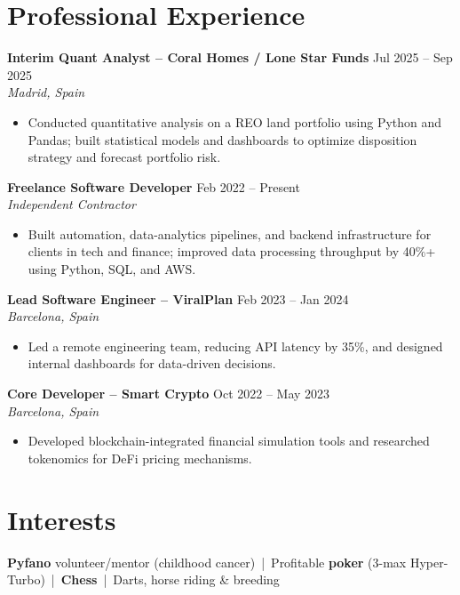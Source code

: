 \documentclass[a4paper]{article}
\begin{document}
\vspace{0.08cm}

\section*{Professional Experience}

\textbf{Interim Quant Analyst -- Coral Homes / Lone Star Funds} \hfill Jul 2025 -- Sep 2025 \\
\textit{Madrid, Spain}
\begin{itemize}
    \item Conducted quantitative analysis on a REO land portfolio using Python and Pandas; built statistical models and dashboards to optimize disposition strategy and forecast portfolio risk.
\end{itemize}

\textbf{Freelance Software Developer} \hfill Feb 2022 -- Present \\
\textit{Independent Contractor}
\begin{itemize}
    \item Built automation, data-analytics pipelines, and backend infrastructure for clients in tech and finance; improved data processing throughput by 40\%+ using Python, SQL, and AWS.
\end{itemize}

\textbf{Lead Software Engineer -- ViralPlan} \hfill Feb 2023 -- Jan 2024 \\
\textit{Barcelona, Spain}
\begin{itemize}
    \item Led a remote engineering team, reducing API latency by 35\%, and designed internal dashboards for data-driven decisions.
\end{itemize}

\textbf{Core Developer -- Smart Crypto} \hfill Oct 2022 -- May 2023 \\
\textit{Barcelona, Spain}
\begin{itemize}
    \item Developed blockchain-integrated financial simulation tools and researched tokenomics for DeFi pricing mechanisms.
\end{itemize}

\vspace{0.08cm}

\section*{Interests}
\textbf{Pyfano} volunteer/mentor (childhood cancer) \,|\, Profitable \textbf{poker} (3-max Hyper-Turbo) \,|\, \textbf{Chess} \,|\, Darts, horse riding \& breeding
\end{document}
